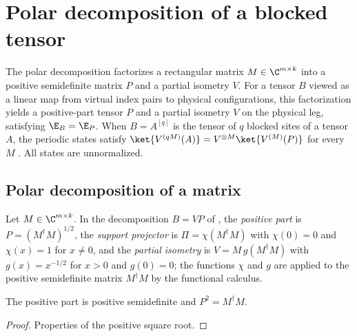 
\section{Polar decomposition of a blocked tensor}\label{sec:ldpolar}

The polar decomposition factorizes a rectangular matrix $M\in\C^{m\times k}$
into a positive semidefinite matrix $P$ and a partial isometry $V$. For a
tensor $B$ viewed as a linear map from virtual index pairs to physical
configurations, this factorization yields a positive-part tensor $P$ and a
partial isometry $V$ on the physical leg, satisfying $\E_B=\E_P$. When $B=A^{[q]}$ is the
tensor of $q$ blocked sites of a tensor $A$, the periodic states satisfy
$\ket{V^{(qM)}(A)}=V^{\otimes M}\ket{V^{(M)}(P)}$ for every $M$
\cite{Malz2024Preparation}. All states are unnormalized.

\subsection{Polar decomposition of a matrix}

\begin{definition}
    \label{def:ldpolar_matrix}
    \leanok
    Let $M\in\C^{m\times k}$. In the decomposition $B=VP$ of
    \cite[eq.~(8) and Supplemental Material]{Malz2024Preparation}, the
    \emph{positive part} is
    $P=(M^\dagger M)^{1/2}$, the \emph{support projector} is
    $\Pi=\chi(M^\dagger M)$ with $\chi(0)=0$ and $\chi(x)=1$ for $x\ne 0$,
    and the \emph{partial isometry} is $V=M\,g(M^\dagger M)$ with
    $g(x)=x^{-1/2}$ for $x>0$ and $g(0)=0$; the functions $\chi$ and $g$ are
    applied to the positive semidefinite matrix $M^\dagger M$ by the
    functional calculus.
\end{definition}

\begin{lemma}
    \label{thm:ldpolar_pos}
    \leanok
    The positive part is positive semidefinite and $P^2=M^\dagger M$.
\end{lemma}
\begin{proof}
    \leanok
    Properties of the positive square root.
\end{proof}

